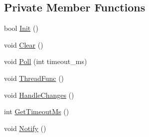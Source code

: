 \subsection*{Private Member Functions}
\begin{DoxyCompactItemize}
\item 
bool \hyperlink{classapollo_1_1cyber_1_1io_1_1Poller_a3d904d64d3a2f4f0a29695a0263f9f82}{Init} ()
\item 
void \hyperlink{classapollo_1_1cyber_1_1io_1_1Poller_aa3e2338ecaeb8cb5ce0cbfdb15d7eb79}{Clear} ()
\item 
void \hyperlink{classapollo_1_1cyber_1_1io_1_1Poller_ae2d156bf9966263391597b959c9515ab}{Poll} (int timeout\-\_\-ms)
\item 
void \hyperlink{classapollo_1_1cyber_1_1io_1_1Poller_ab5de085f3ce0d9030d02a81b17f21d7e}{Thread\-Func} ()
\item 
void \hyperlink{classapollo_1_1cyber_1_1io_1_1Poller_a32b96845dcf187f57eb322ceb8b76c89}{Handle\-Changes} ()
\item 
int \hyperlink{classapollo_1_1cyber_1_1io_1_1Poller_ad106607e755fc50c05d81a91fccca9d8}{Get\-Timeout\-Ms} ()
\item 
void \hyperlink{classapollo_1_1cyber_1_1io_1_1Poller_a5a8bb1e33405acb498772bc02fa816bf}{Notify} ()
\end{DoxyCompactItemize}
